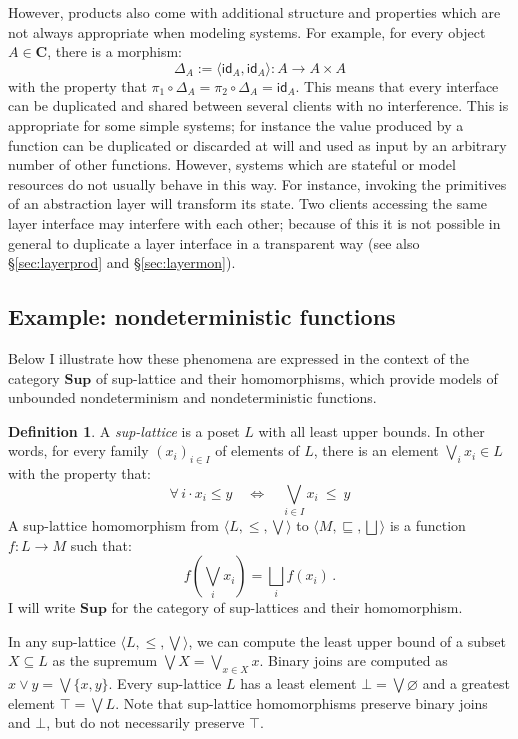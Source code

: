 \documentclass[11pt,oneside,draft]{book}
\theoremstyle{definition}
\newtheorem{definition}[theorem]{Definition}
\newcommand{\kw}[1]{\ensuremath{ \mathsf{#1} }}
\newcommand{\bdot}{\boldsymbol{\cdot}}
\begin{document}
However,
products also come with additional structure and properties
which are not always appropriate
when modeling systems.
For example,
for every object $A \in \mathbf{C}$,
there is a morphism:
\[
  \Delta_A := \langle \kw{id}_A, \kw{id}_A \rangle :
    A \rightarrow A \times A
\]
with the property that
$\pi_1 \circ \Delta_A = \pi_2 \circ \Delta_A = \kw{id}_A$.
This means that every interface can be duplicated
and shared between several clients with no interference.
This is appropriate for some simple systems;
for instance the value produced by a function
can be duplicated or discarded at will
and used as input by an arbitrary number of other functions.
However,
systems which are stateful or model resources
do not usually behave in this way.
For instance,
invoking the primitives of an abstraction layer
will transform its state.
Two clients accessing the same layer interface
may interfere with each other;
because of this it is not possible in general
to duplicate a layer interface
in a transparent way
(see also \S\ref{sec:layerprod} and \S\ref{sec:layermon}).


\subsection{Example: nondeterministic functions} %

Below I illustrate how these phenomena
are expressed in the context of the category $\mathbf{Sup}$
of sup-lattice and their homomorphisms,
which provide models of unbounded nondeterminism
and nondeterministic functions.

\begin{definition} %
A \emph{sup-lattice} is a poset $L$
with all least upper bounds.
In other words,
for every family $(x_i)_{i \in I}$
of elements of $L$,
there is an element
$\bigvee_i x_i \in L$
with the property that:
\[
  \forall \, i \, \bdot \, x_i \le y
  \quad \Leftrightarrow \quad
  \bigvee_{i \in I} x_i \: \le \: y
\]
A sup-lattice homomorphism
from $\langle L, {\le}, {\bigvee} \rangle$
to $\langle M, {\sqsubseteq}, {\bigsqcup} \rangle$
is a function $f : L \rightarrow M$
such that:
\[
  f \left( \bigvee_i x_i \right) =
  \bigsqcup_i f(x_i)
  \,.
\]
I will write $\mathbf{Sup}$ for
the category of sup-lattices and their homomorphism.
\end{definition}

In any sup-lattice $\langle L, {\le}, {\bigvee} \rangle$,
we can compute the least upper bound
of a subset $X \subseteq L$
as the supremum $\bigvee X = \bigvee_{x \in X} x$.
Binary joins are computed as $x \vee y = \bigvee \{ x, y \}$.
Every sup-lattice $L$ has
a least element $\bot = \bigvee \varnothing$ and
a greatest element $\top = \bigvee L$.
Note that sup-lattice homomorphisms
preserve binary joins and $\bot$,
but do not necessarily preserve $\top$.
\end{document}
